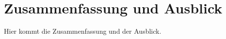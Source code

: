 \section{Zusammenfassung und Ausblick}
\label{sec:zusammen-ausbl}
Hier kommt die Zusammenfassung und der Ausblick.